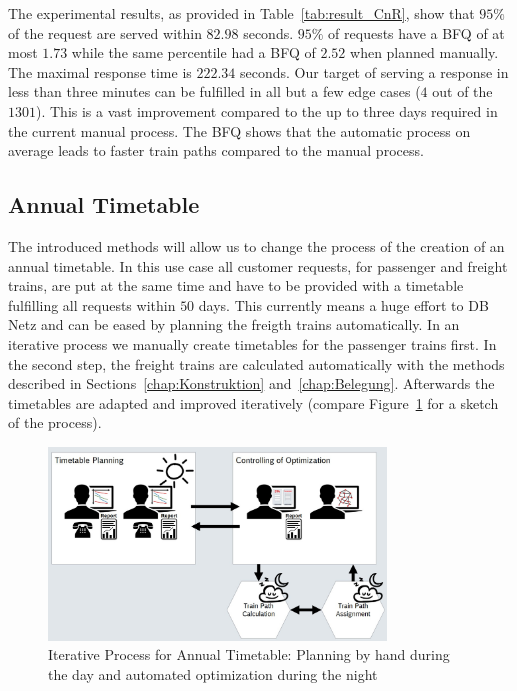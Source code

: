 The experimental results, as provided in Table~\ref{tab:result_CnR}, show that $95\%$ of the request are served within $82.98$ seconds. $95\%$ of requests have a BFQ of at most $1.73$ while the same percentile had a BFQ of $2.52$ when planned manually. The maximal response time is $222.34$ seconds. Our target of serving a response in less than three minutes can be fulfilled in all but a few edge cases ($4$ out of the $1301$). This is a vast improvement compared to the up to three days required in the current manual process. The BFQ shows that the automatic process on average leads to faster train paths compared to the manual process.

\subsection{Annual Timetable}
\label{chap:Netzfahrplan}

The introduced methods will allow us to change the process of the creation of an annual timetable. In this use case all customer requests, for passenger and freight trains, are put at the same time and have to be provided with a timetable fulfilling all requests within $50$ days. This currently means a huge effort to DB Netz and can be eased by planning the freigth trains automatically. In an iterative process we manually create timetables for the passenger trains first. In the second step, the freight trains are calculated automatically with the methods described in Sections~\ref{chap:Konstruktion} and~\ref{chap:Belegung}. Afterwards the timetables are adapted and improved iteratively (compare Figure~\ref{fig:annual_planning} for a sketch of the process).

\begin{figure}[htb]
	\centering
	\includegraphics[width=0.8\textwidth]{Bilder/annual_planning.jpg}
	\caption{Iterative Process for Annual Timetable: Planning by hand during the day and automated optimization during the night}
	\label{fig:annual_planning}
\end{figure}

